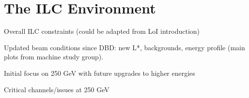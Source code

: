 \chapter{The ILC Environment}


Overall ILC constraints (could be adapted from LoI introduction) 

Updated beam conditions since DBD: new L*, backgrounds, energy profile (main plots from machine study group).

Initial focus on 250 GeV with future upgrades to higher energies

Critical channels/issues at 250 GeV
